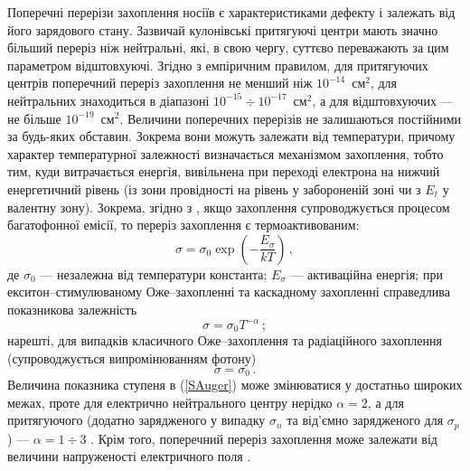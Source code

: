 Поперечні перерізи захоплення носіїв є характеристиками
дефекту і залежать від його зарядового стану.
Зазвичай кулонівські притягуючі центри мають значно більший переріз ніж нейтральні,
які, в свою чергу, суттєво переважають за цим параметром відштовхуючі.
Згідно з емпіричним правилом, для притягуючих центрів  поперечний переріз захоплення
не менший ніж $10^{-14}$~см$^2$,
для нейтральних знаходиться в діапазоні $10^{-15}\div10^{-17}$~см$^2$,
а для відштовхуючих --- не більше $10^{-19}$~см$^2$.
Величини поперечних перерізів не залишаються постійними за будь-яких обставин.
Зокрема вони можуть залежати від температури, причому
характер температурної залежності визначається механізмом захоплення,
тобто тим, куди витрачається енергія, вивільнена при переході електрона на нижчий енергетичний рівень
(із зони провідності на рівень у забороненій зоні чи з $E_t$ у валентну зону).
Зокрема, згідно з \cite{ROUGIEUX2018},
якщо захоплення супроводжується процесом багатофонної емісії, то
переріз захоплення є термоактивованим:
\begin{equation}
\label{Sta}
 \sigma=\sigma_0\exp\left(-\frac{E_{\sigma}}{kT}\right)\,,
\end{equation}
де
$\sigma_0$ --- незалежна від температури константа;
$E_{\sigma}$ --- активаційна енергія;
при екситон--стимулюваному Оже--захопленні та каскадному захопленні
справедлива показникова залежність
\begin{equation}
\label{SAuger}
 \sigma=\sigma_0 T^{-\alpha}\,;
\end{equation}
нарешті, для випадків класичного Оже--захоплення та радіаційного
захоплення (супроводжується випромінюванням фотону)
\begin{equation}
\label{Sklas}
 \sigma=\sigma_0\,.
\end{equation}
Величина показника ступеня в (\ref{SAuger}) може змінюватися у достатньо широких
межах, проте для електрично нейтрального центру нерідко $\alpha=2$,
а для притягуючого (додатно зарядженого у випадку $\sigma_n$
та від'ємно зарядженого для $\sigma_p$) --- $\alpha=1\div3$ \cite{Sachenko2017}.
Крім того, поперечний переріз захоплення може залежати від величини напруженості електричного поля \cite{Shishiyanu,Bourgoin2001}.


